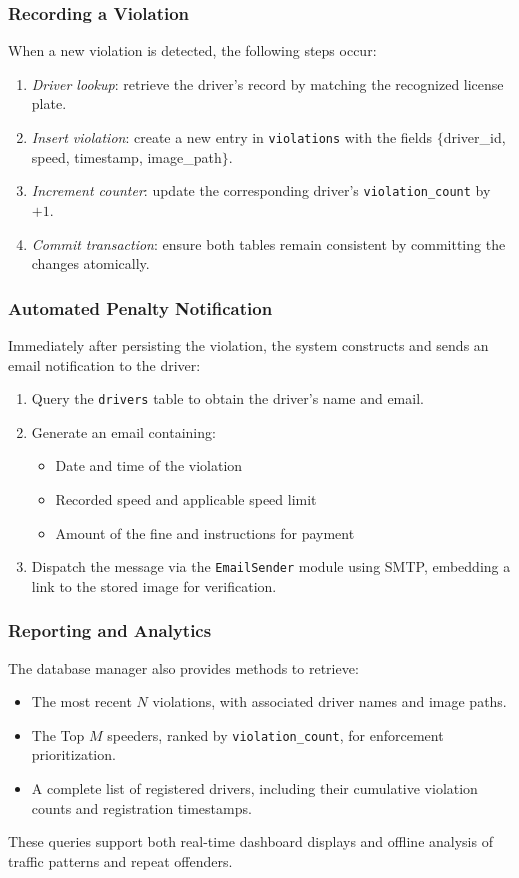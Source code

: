 \subsubsection{Recording a Violation}
When a new violation is detected, the following steps occur:
\begin{enumerate}
  \item \emph{Driver lookup}: retrieve the driver’s record by matching the recognized license plate.  
  \item \emph{Insert violation}: create a new entry in \texttt{violations} with the fields  
    \(\{\)driver\_id, speed, timestamp, image\_path\(\}\).  
  \item \emph{Increment counter}: update the corresponding driver’s \texttt{violation\_count} by \(+1\).
  \item \emph{Commit transaction}: ensure both tables remain consistent by committing the changes atomically.
\end{enumerate}

\subsubsection{Automated Penalty Notification}
Immediately after persisting the violation, the system constructs and sends an email notification to the driver:
\begin{enumerate}
  \item Query the \texttt{drivers} table to obtain the driver’s name and email.
  \item Generate an email containing:
    \begin{itemize}
      \item Date and time of the violation
      \item Recorded speed and applicable speed limit
      \item Amount of the fine and instructions for payment
    \end{itemize}
  \item Dispatch the message via the \texttt{EmailSender} module using SMTP, embedding a link to the stored image for verification.
\end{enumerate}

\subsubsection{Reporting and Analytics}
The database manager also provides methods to retrieve:
\begin{itemize}
  \item The most recent \(N\) violations, with associated driver names and image paths.
  \item The Top \(M\) speeders, ranked by \texttt{violation\_count}, for enforcement prioritization.
  \item A complete list of registered drivers, including their cumulative violation counts and registration timestamps.
\end{itemize}
These queries support both real-time dashboard displays and offline analysis of traffic patterns and repeat offenders.

